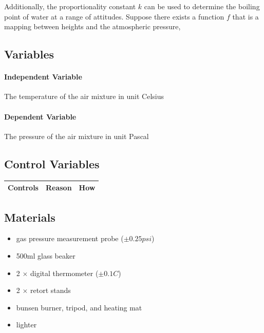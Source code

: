 \documentclass[a4paper,12pt]{article}
\begin{document}



Additionally, the proportionality constant $k$ can be used to determine the boiling point of water at a range of attitudes. Suppose there exists a function $f$ that is a mapping between heights and the atmospheric pressure,




\subsection{Variables}
\paragraph{Independent Variable}
The temperature of the air mixture in unit Celsius

\paragraph{Dependent Variable}
The pressure of the air mixture in unit Pascal

\subsection{Control Variables}

\begin{longtable}{P{0.2\textwidth}|P{0.35\textwidth}|P{0.35\textwidth}}
Controls & Reason & How\\\hline
\end{longtable}

\subsection{Materials}

\begin{itemize}
    \item gas pressure measurement probe ($\pm 0.25\si{psi}$)
    \item 500ml glass beaker
    \item 2 $\times$ digital thermometer ($\pm 0.1\si{C}$)
    \item 2 $\times$ retort stands
    \item bunsen burner, tripod, and heating mat
    \item lighter
\end{itemize}
\end{document}
